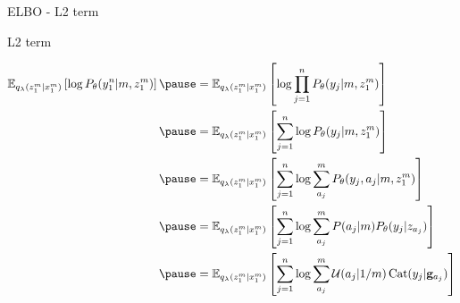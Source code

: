 \begin{frame}[plain]{ELBO - L2 term}

L2 term
\begin{small}
\begin{equation*}
\begin{aligned}
\mathbb E_{q_\lambda(z_1^m|x_1^m)}\left[ \log P_\theta(y_1^n|m, z_1^m)\right] 
\pause &= \mathbb E_{q_\lambda(z_1^m|x_1^m)}\left[ \log \prod_{j=1}^n P_\theta(y_j|m, z_1^m)\right]  \\ \pause
&= \mathbb E_{q_\lambda(z_1^m|x_1^m)}\left[  \sum_{j=1}^n \log P_\theta(y_j|m, z_1^m)\right]   \\ \pause
&= \mathbb E_{q_\lambda(z_1^m|x_1^m)}\left[  \sum_{j=1}^n \log \sum_{a_j}^m P_\theta(y_j, a_j|m, z_1^m)\right]   \\ \pause
&= \mathbb E_{q_\lambda(z_1^m|x_1^m)}\left[  \sum_{j=1}^n \log \sum_{a_j}^m P(a_j|m) P_\theta(y_j|z_{a_j}) \right]  \\  \pause
&= \mathbb E_{q_\lambda(z_1^m|x_1^m)}\left[  \sum_{j=1}^n \log \sum_{a_j}^m \mathcal U(a_j|1/m) \Cat(y_j|\mathbf g_{a_j})\right]
\end{aligned}
\end{equation*}
\end{small}


\end{frame}

